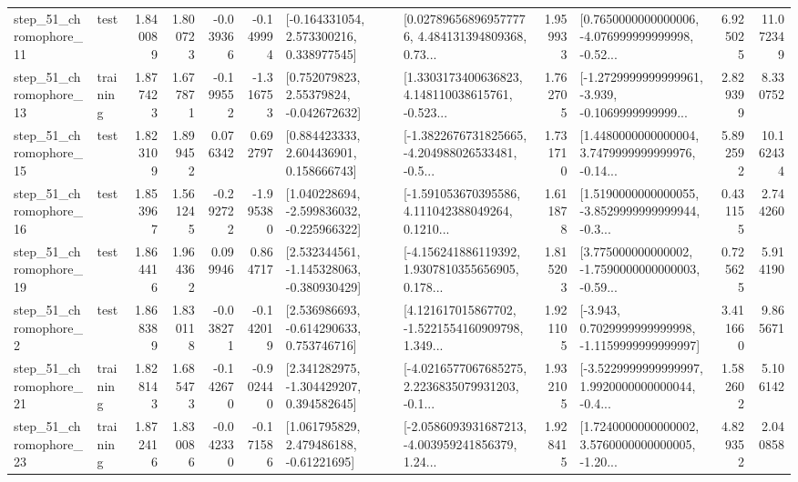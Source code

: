 \begin{tabular}{llrrrrllrlrr}
   step\_51\_chromophore\_11 &      test &      1.840089 &    1.800723 &     -0.039366 & -0.149994 &    [-0.164331054, 2.573300216, 0.338977545] &  [0.027896568969577776, 4.484131394809368, 0.73... &       1.959933 &  [0.7650000000000006, -4.076999999999998, -0.52... &            6.925025 &         11.072349 \\
   step\_51\_chromophore\_13 &  training &      1.877423 &    1.677871 &     -0.199552 & -1.316753 &     [0.752079823, 2.55379824, -0.042672632] &  [1.3303173400636823, 4.148110038615761, -0.523... &       1.762705 &  [-1.2729999999999961, -3.939, -0.1069999999999... &            2.829399 &          8.330752 \\
   step\_51\_chromophore\_15 &      test &      1.823109 &    1.899452 &      0.076342 &  0.692797 &     [0.884423333, 2.604436901, 0.158666743] &  [-1.3822676731825665, -4.204988026533481, -0.5... &       1.731710 &  [1.4480000000000004, 3.7479999999999976, -0.14... &            5.892592 &         10.162434 \\
   step\_51\_chromophore\_16 &      test &      1.853967 &    1.561245 &     -0.292722 & -1.995380 &   [1.040228694, -2.599836032, -0.225966322] &  [-1.591053670395586, 4.111042388049264, 0.1210... &       1.611878 &  [1.5190000000000055, -3.8529999999999944, -0.3... &            0.431155 &          2.744260 \\
   step\_51\_chromophore\_19 &      test &      1.864416 &    1.964362 &      0.099946 &  0.864717 &   [2.532344561, -1.145328063, -0.380930429] &  [-4.156241886119392, 1.9307810355656905, 0.178... &       1.815203 &  [3.775000000000002, -1.7590000000000003, -0.59... &            0.725625 &          5.914190 \\
    step\_51\_chromophore\_2 &      test &      1.868389 &    1.830118 &     -0.038271 & -0.142019 &    [2.536986693, -0.614290633, 0.753746716] &  [4.121617015867702, -1.5221554160909798, 1.349... &       1.921105 &  [-3.943, 0.7029999999999998, -1.1159999999999997] &            3.411660 &          9.865671 \\
   step\_51\_chromophore\_21 &  training &      1.828143 &    1.685473 &     -0.142670 & -0.902440 &    [2.341282975, -1.304429207, 0.394582645] &  [-4.0216577067685275, 2.2236835079931203, -0.1... &       1.932105 &  [-3.5229999999999997, 1.9920000000000044, -0.4... &            1.582602 &          5.106142 \\
   step\_51\_chromophore\_23 &  training &      1.872416 &    1.830086 &     -0.042330 & -0.171586 &     [1.061795829, 2.479486188, -0.61221695] &  [-2.0586093931687213, -4.003959241856379, 1.24... &       1.928415 &  [1.7240000000000002, 3.5760000000000005, -1.20... &            4.829352 &          2.040858 \\

\end{tabular}
